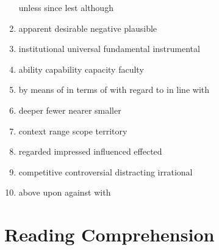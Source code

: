 \begin{enumerate}
\fourchoices
{unless}
{since}
{lest}
{although}




\item


\fourchoices
{apparent}
{desirable}
{negative}
{plausible}




\item


\fourchoices
{institutional}
{universal}
{fundamental}
{instrumental}




\item


\fourchoices
{ability}
{capability}
{capacity}
{faculty}




\item


\fourchoices
{by means of}
{in terms of}
{with regard to}
{in line with}





\item


\fourchoices
{deeper}
{fewer}
{nearer}
{smaller}




\item


\fourchoices
{context}
{range}
{scope}
{territory}




\item


\fourchoices
{regarded}
{impressed}
{influenced}
{effected}




\item


\fourchoices
{competitive}
{controversial}
{distracting}
{irrational}




\item


\fourchoices
{above}
{upon}
{against}
{with}

\end{enumerate}

\vfil

\section{Reading Comprehension}






